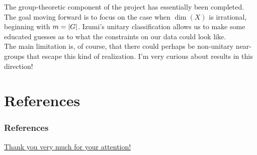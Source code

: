 \documentclass{beamer}
\DeclarePairedDelimiter{\abs}{\lvert}{\rvert}
\begin{document}
\begin{frame}
The group-theoretic component of the project has essentially been completed.\\[2ex]

The goal moving forward is to focus on the case when $\dim(X)$ is irrational, beginning with $m = \abs{G}$. Izumi's unitary classification allows us to make some educated guesses as to what the constraints on our data could look like.\\[2ex]

The main limitation is, of course, that there could perhaps be non-unitary near-groups that escape this kind of realization. I'm very curious about results in this direction!
\end{frame}


\section*{References}

\begin{frame}[allowframebreaks]
\frametitle{References}
\printbibliography[heading = none]
\end{frame}


\begin{frame}
\noindent\centerline{\LARGE\textcolor{structure}{\underline{Thank you very much for your attention!}}}
\end{frame}
\end{document}
